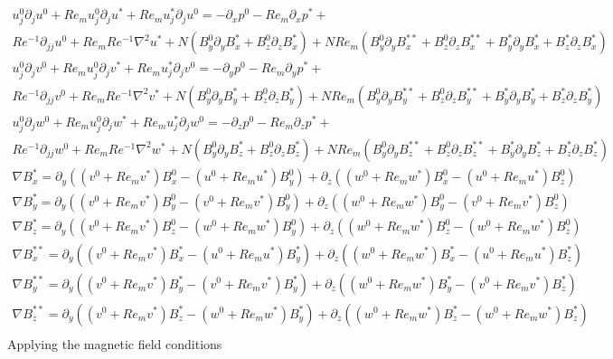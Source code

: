 \documentclass[11pt]{article}
\newcommand{\PD}{\partial}
\begin{document}
\begin{equation}\begin{aligned}
u_j^0 \PD_j u^0 + Re_m u_j^0 \PD_j u^* + Re_m u_j^* \PD_j u^0 = -\PD_x p^0 - Re_m\PD_x p^*+ \\ Re^{-1} \PD_{jj} u^0 + Re_m Re^{-1} \nabla^2 u^* + N (B_y^0 \PD_y B_x^* + B_z^0 \PD_z B_x^*) + N Re_m ( B_y^0 \PD_y B_x^{**} + B_z^0 \PD_z B_x^{**} + B_y^* \PD_y B_x^* + B_z^* \PD_z B_x^* ) \\
u_j^0 \PD_j v^0 + Re_m u_j^0 \PD_j v^* + Re_m u_j^* \PD_j v^0 = -\PD_y p^0 - Re_m\PD_y p^*+ \\ Re^{-1} \PD_{jj} v^0 + Re_m Re^{-1} \nabla^2 v^* + N (B_y^0 \PD_y B_y^* + B_z^0 \PD_z B_y^*) + N Re_m ( B_y^0 \PD_y B_y^{**} + B_z^0 \PD_z B_y^{**} + B_y^* \PD_y B_y^* + B_z^* \PD_z B_y^* ) \\
u_j^0 \PD_j w^0 + Re_m u_j^0 \PD_j w^* + Re_m u_j^* \PD_j w^0 = -\PD_z p^0 - Re_m\PD_z p^*+ \\ Re^{-1} \PD_{jj} w^0 + Re_m Re^{-1} \nabla^2 w^* + N (B_y^0 \PD_y B_z^* + B_z^0 \PD_z B_z^*) + N Re_m ( B_y^0 \PD_y B_z^{**} + B_z^0 \PD_z B_z^{**} + B_y^* \PD_y B_z^* + B_z^* \PD_z B_z^* ) \\
\nabla B_x^{*}  = \PD_y ((v^0+Re_m v^*) B_x^{0} - (u^0+Re_m u^*) B_y^{0}) + \PD_z ((w^0+Re_m w^*) B_x^{0} - (u^0+Re_m u^*) B_z^{0}) \\
\nabla B_y^{*}  = \PD_y ((v^0+Re_m v^*) B_y^{0} - (v^0+Re_m v^*) B_y^{0}) + \PD_z ((w^0+Re_m w^*) B_y^{0} - (v^0+Re_m v^*) B_z^{0}) \\
\nabla B_z^{*}  = \PD_y ((v^0+Re_m v^*) B_z^{0} - (w^0+Re_m w^*) B_y^{0}) + \PD_z ((w^0+Re_m w^*) B_z^{0} - (w^0+Re_m w^*) B_z^{0}) \\
\nabla B_x^{**} = \PD_y ((v^0+Re_m v^*) B_x^{*} - (u^0+Re_m u^*) B_y^{*}) + \PD_z ((w^0+Re_m w^*) B_x^{*} - (u^0+Re_m u^*) B_z^{*}) \\
\nabla B_y^{**} = \PD_y ((v^0+Re_m v^*) B_y^{*} - (v^0+Re_m v^*) B_y^{*}) + \PD_z ((w^0+Re_m w^*) B_y^{*} - (v^0+Re_m v^*) B_z^{*}) \\
\nabla B_z^{**} = \PD_y ((v^0+Re_m v^*) B_z^{*} - (w^0+Re_m w^*) B_y^{*}) + \PD_z ((w^0+Re_m w^*) B_z^{*} - (w^0+Re_m w^*) B_z^{*}) \\
\end{aligned}\end{equation}
Applying the magnetic field conditions
\end{document}
